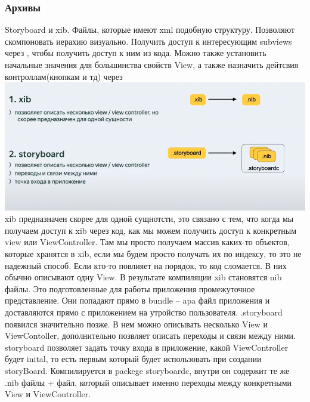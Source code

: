 \documentclass{article}
\begin{document}
        \subsubsection{Архивы}
        Storyboard и xib. Файлы, которые имеют xml подобную структуру. Позволяют скомпоновать иерахию визуально. Получить доступ к интересующим subviews через , чтобы получить доступ к ним из кода. 
        \newline
        Можно также установить начальные значения для большинства свойств View, а также назначить дейтсвия контроллам(кнопкам и тд) через 
        \newline
        \includegraphics[scale = 0.5]{pic/Снимок экрана 2023-08-02 в 21.02.36.png}
        \newline
        xib предназначен скорее для одной сущнотсти, это связано с тем, что когда мы получаем доступ к xib через код, как мы можем получить доступ к конкретным view или ViewController. Там мы просто получаем массив каких-то объектов, которые хранятся в xib, если мы будем просто получать их по индексу, то это не надежный способ. Если кто-то повлияет на порядок, то код сломается. В них обычно описывают одну View.
        \newline
        В результате компиляции xib становятся nib файлы. Это подготовленные для работы приложения промежуточное представление. Они попадают прямо в bundle -- apa файл приложения и доставляются прямо с приложением на утройство пользователя. 
        \newline
        .storyboard появился значительно позже. В нем можно описывать несколько View и ViewContoller, дополнительно позвляет описать переходы и связи между ними. 
        \newline
        storyboard позволяет задать точку входа в приложение, какой ViewController будет inital, то есть первым который будет использовать при создании storyBoard. Компилируется в packege storyboardc, внутри он содержит те же .nib файлы + файл, который описывает именно переходы между конкретными View и ViewController.
\end{document}
